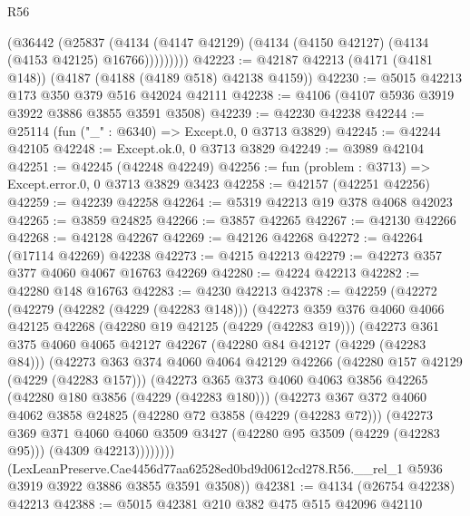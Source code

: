 \begin{lexlean}{R56}
\begin{coremodule}
            (@36442
              (@25837
                (@4134 (@4147 @42129) (@4134 (@4150 @42127) (@4134 (@4153 @42125) @16766)))))))))
@42223 := @42187 @42213 (@4171 (@4181 @148)) (@4187 (@4188 (@4189 @518) @42138 @4159))
@42230 := @5015 @42213 @173 @350 @379 @516 @42024 @42111
@42238 := @4106 (@4107 @5936 @3919 @3922 @3886 @3855 @3591 @3508)
@42239 := @42230 @42238
@42244 := @25114 (fun ("_" : @6340) => Except.{0, 0} @3713 @3829)
@42245 := @42244 @42105
@42248 := Except.ok.{0, 0} @3713 @3829
@42249 := @3989 @42104
@42251 := @42245 (@42248 @42249)
@42256 := fun (problem : @3713) => Except.error.{0, 0} @3713 @3829 @3423
@42258 := @42157 (@42251 @42256)
@42259 := @42239 @42258
@42264 := @5319 @42213 @19 @378 @4068 @42023
@42265 := @3859 @24825
@42266 := @3857 @42265
@42267 := @42130 @42266
@42268 := @42128 @42267
@42269 := @42126 @42268
@42272 := @42264 (@17114 @42269) @42238
@42273 := @4215 @42213
@42279 := @42273 @357 @377 @4060 @4067 @16763 @42269
@42280 := @4224 @42213
@42282 := @42280 @148 @16763
@42283 := @4230 @42213
@42378 := @42259
    (@42272
      (@42279
        (@42282 (@4229 (@42283 @148)))
        (@42273
          @359
          @376
          @4060
          @4066
          @42125
          @42268
          (@42280 @19 @42125 (@4229 (@42283 @19)))
          (@42273
            @361
            @375
            @4060
            @4065
            @42127
            @42267
            (@42280 @84 @42127 (@4229 (@42283 @84)))
            (@42273
              @363
              @374
              @4060
              @4064
              @42129
              @42266
              (@42280 @157 @42129 (@4229 (@42283 @157)))
              (@42273
                @365
                @373
                @4060
                @4063
                @3856
                @42265
                (@42280 @180 @3856 (@4229 (@42283 @180)))
                (@42273
                  @367
                  @372
                  @4060
                  @4062
                  @3858
                  @24825
                  (@42280 @72 @3858 (@4229 (@42283 @72)))
                  (@42273
                    @369
                    @371
                    @4060
                    @4060
                    @3509
                    @3427
                    (@42280 @95 @3509 (@4229 (@42283 @95)))
                    (@4309 @42213))))))))
      (LexLeanPreserve.Cae4456d77aa62528ed0bd9d0612cd278.R56.__rel_1
        @5936
        @3919
        @3922
        @3886
        @3855
        @3591
        @3508))
@42381 := @4134 (@26754 @42238) @42213
@42388 := @5015 @42381 @210 @382 @475 @515 @42096 @42110

\end{coremodule}
\end{lexlean}
